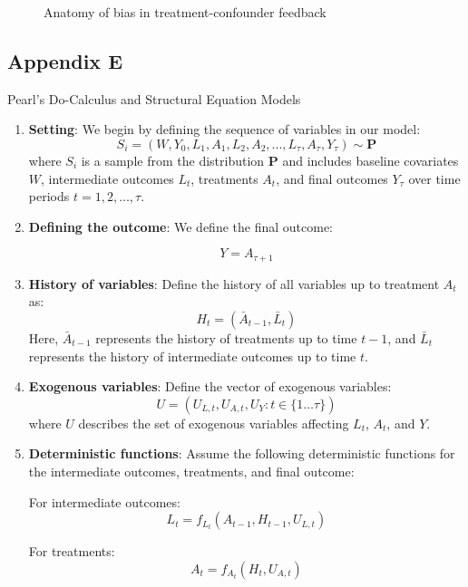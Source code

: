 \documentclass[
  single column]{article}
\begin{document}
\begin{figure}

\centering{

\feedbackB

}

\caption{\label{fig-timevarying-nofeedback}Anatomy of bias in
treatment-confounder feedback}

\end{figure}%

\newpage{}

\subsection{Appendix E}\label{appendix-e}

Pearl's Do-Calculus and Structural Equation Models

\begin{enumerate}
\def\labelenumi{\arabic{enumi}.}
\item
  \textbf{Setting}: We begin by defining the sequence of variables in
  our model: \[
  S_i= (W, Y_0, L_1, A_1, L_2, A_2, ..., L_\tau, A_\tau, Y_{\tau}) \sim \mathbf{P}
  \] where \(S_i\) is a sample from the distribution \(\mathbf{P}\) and
  includes baseline covariates \(W\), intermediate outcomes \(L_t\),
  treatments \(A_t\), and final outcomes \(Y_{\tau}\) over time periods
  \(t = 1, 2, \ldots, \tau\).
\item
  \textbf{Defining the outcome}: We define the final outcome:

  \[
  Y = A_{\tau + 1}
  \]
\item
  \textbf{History of variables}: Define the history of all variables up
  to treatment \(A_t\) as: \[
  H_t = (\bar{A}_{t-1}, \bar{L}_t)
  \] Here, \(\bar{A}_{t-1}\) represents the history of treatments up to
  time \(t-1\), and \(\bar{L}_t\) represents the history of intermediate
  outcomes up to time \(t\).
\item
  \textbf{Exogenous variables}: Define the vector of exogenous
  variables: \[
  U = (U_{L,t}, U_{A,t}, U_{Y}: t \in \{1 \dots \tau\})
  \] where \(U\) describes the set of exogenous variables affecting
  \(L_t\), \(A_t\), and \(Y\).
\item
  \textbf{Deterministic functions}: Assume the following deterministic
  functions for the intermediate outcomes, treatments, and final
  outcome:

  For intermediate outcomes: \[
  L_t = f_{L_t}(A_{t-1}, H_{t-1}, U_{L,t})
  \]

  For treatments: \[
  A_t = f_{A_t}(H_t, U_{A,t})
  \]


\end{enumerate}
\end{document}

